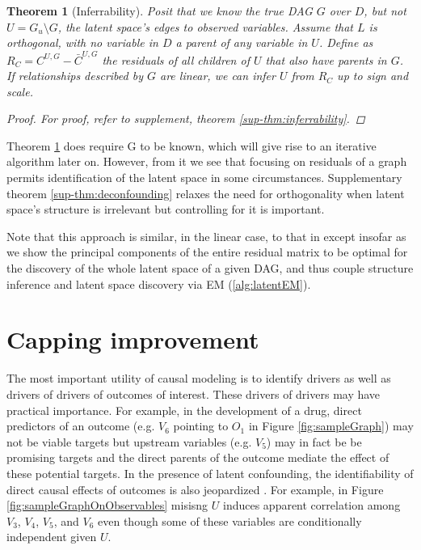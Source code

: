 \documentclass{article}
\newtheorem{theorem}{Theorem}
\begin{document}
\begin{theorem}[Inferrability]
\label{thm:inferrability}
Posit that we know the true DAG $G$ over $D$, but not $U = G_u \setminus G$, the latent space's edges to observed variables.  Assume that $L$ is orthogonal, with no variable in $D$ a parent of any variable in $U$. Define as $R_C = C^{U,G} - \bar{C}^{U,G}$ the residuals of all children of $U$ that also have parents in $G$.  If relationships described by $G$ are linear, we can infer $U$ from $R_C$ up to sign and scale.  

\begin{proof}
For proof, refer to supplement, theorem \ref{sup-thm:inferrability}.
\end{proof}
\end{theorem}

Theorem \ref{thm:inferrability} does require G to be known, which will give rise to an iterative algorithm later on.  However, from it we see that focusing on residuals of a graph permits identification of the latent space in some circumstances.  Supplementary theorem \ref{sup-thm:deconfounding} relaxes the need for orthogonality when latent space's structure is irrelevant but controlling for it is important.

Note that this approach is similar, in the linear case, to that in \cite{elidan_ideal_2007} except insofar as we show the principal components of the entire residual matrix to be optimal for the discovery of the whole latent space of a given DAG, and thus couple structure inference and latent space discovery via EM (\ref{alg:latentEM}).

\section{Capping improvement}

The most important utility of causal modeling is to identify drivers as well as drivers of drivers of outcomes of interest.  These drivers of drivers may have practical importance. For example, in the development of a drug, direct predictors of an outcome (e.g. $V_6$ pointing to $O_{1}$ in Figure \ref{fig:sampleGraph}) may not be viable targets but upstream variables (e.g. $V_{5}$) may in fact be be promising targets and the direct parents of the outcome mediate the effect of these potential targets. In the presence of latent confounding, the identifiability of direct causal effects of outcomes is also jeopardized \cite{hernan_estimating_2006}.  For example, in Figure \ref{fig:sampleGraphOnObservables} misisng $U$ induces apparent correlation among $V_3$, $V_4$, $V_5$, and $V_6$ even though some of these variables are conditionally independent given $U$.  
\end{document}
